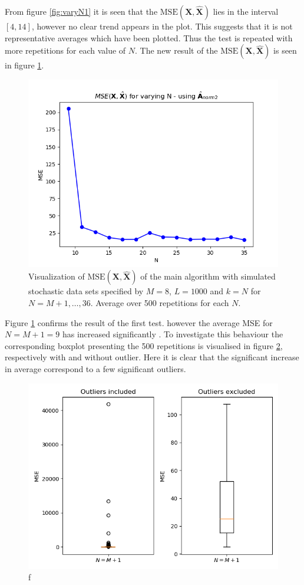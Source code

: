 \noindent
From figure \ref{fig:varyN1} it is seen that the $\text{MSE}(\mathbf{X}, \hat{\mathbf{X}})$ lies in the interval $[4,14]$, however no clear trend appears in the plot. 
This suggests that it is not representative averages which have been plotted. Thus the test is repeated with more repetitions for each value of $N$. The new result of the $\text{MSE}(\mathbf{X}, \hat{\mathbf{X}})$ is seen in figure \ref{fig:varyN2}.
\begin{figure}[H]
    \centering
	\includegraphics[scale=0.5]{figures/ch_6/varyN2.png}
	\caption{Visualization of $\text{MSE}(\mathbf{X}, \hat{\mathbf{X}})$ of the main algorithm with simulated stochastic data sets specified by $M = 8$, $L=1000$ and $k = N$ for $N = M+1, \hdots , 36$. Average over 500 repetitions for each $N$.}
	\label{fig:varyN2}
\end{figure}  
\noindent
Figure \ref{fig:varyN2} confirms the result of the first test. however the average MSE for $N=M+1 = 9$ has increased significantly . To investigate this behaviour the corresponding boxplot presenting the 500 repetitions is visualised in figure \ref{fig:box}, respectively with and without outlier. Here it is clear that the significant increase in average correspond to a few significant outliers. 
\begin{figure}[H]
    \centering
	\includegraphics[scale=0.5]{figures/ch_6/boxplot.png}
	\caption{f}
	\label{fig:box}
\end{figure}

